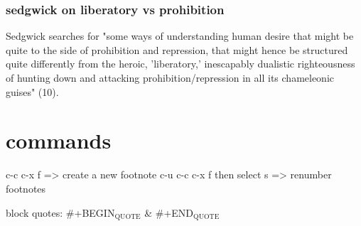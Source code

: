 \documentclass[11pt]{article}
\begin{document}
\subsubsection{sedgwick on liberatory vs prohibition}
\label{sec:org82a8b2b}
Sedgwick searches for "some ways of understanding human desire that might
be quite to the side of prohibition and repression, that might hence
be structured quite differently from the heroic, 'liberatory,'
inescapably dualistic righteousness of hunting down and attacking
prohibition/repression in all its chameleonic guises" (10).


\section{commands}
\label{sec:orgf772323}
c-c c-x f => create a new footnote
c-u c-c c-x f then select s => renumber footnotes

block quotes: \#+BEGIN\(_{\text{QUOTE}}\) \& \#+END\(_{\text{QUOTE}}\)
\end{document}
